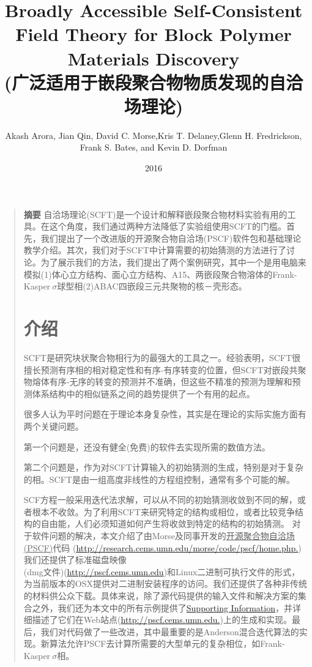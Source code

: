 \documentclass{article}
\begin{document}
\begin{CJK}{UTF8}{gkai}
 

\title{Broadly Accessible Self-Consistent Field Theory for Block Polymer Materials Discovery\\
(广泛适用于嵌段聚合物物质发现的自洽场理论)}
\author{Akash Arora, Jian Qin, David C. Morse,Kris T. Delaney,Glenn H. Fredrickson, Frank S. Bates, and Kevin D. Dorfman}
\date{2016}
\maketitle
\begin{quotation}
\textbf{摘要}
自洽场理论(SCFT)是一个设计和解释嵌段聚合物材料实验有用的工具。在这个角度，我们通过两种方法降低了实验组使用SCFT的门槛。首先，我们提出了一个改进版的开源聚合物自洽场(PSCF)软件包和基础理论教学介绍。其次，我们对于SCFT中计算需要的初始猜测的方法进行了讨论。为了展示我们的方法，我们提出了两个案例研究，其中一个是用电脑来模拟(1)体心立方结构、面心立方结构、A15、两嵌段聚合物溶体的Frank-Kasper$~\sigma$球型相(2)ABAC四嵌段三元共聚物的核－壳形态。

\section{介绍}
SCFT是研究块状聚合物相行为的最强大的工具之一。经验表明，SCFT很擅长预测有序相的相对稳定性和有序-有序转变的位置，但SCFT对嵌段共聚物熔体有序-无序的转变的预测并不准确，但这些不精准的预测为理解和预测体系结构中的相似链系之间的趋势提供了一个有用的起点。

很多人认为平时问题在于理论本身复杂性，其实是在理论的实际实施方面有两个关键问题。

第一个问题是，还没有健全(免费)的软件去实现所需的数值方法。

第二个问题是，作为对SCFT计算输入的初始猜测的生成，特别是对于复杂的相。SCFT是由一组高度非线性的方程组控制，通常有多个可能的解。

SCF方程一般采用迭代法求解，可以从不同的初始猜测收敛到不同的解，或者根本不收敛。为了利用SCFT来研究特定的结构或相位，或者比较竞争结构的自由能，人们必须知道如何产生将收敛到特定的结构的初始猜测。
对于软件问题的解决，本文介绍了由Morse及同事开发的\underline{开源聚合物自洽场(PSCF)}代码
(\url{http://research.cems.umn.edu/morse/code/pscf/home.php.})
我们还提供了标准磁盘映像\\
(dmg文件)(\url{http://pscf.cems.umn.edu})和Linux二进制可执行文件的形式，为当前版本的OSX提供对二进制安装程序的访问。我们还提供了各种非传统的材料供公众下载。具体来说，除了源代码提供的输入文件和解决方案的集合之外，我们还为本文中的所有示例提供了\href{http://pubs.acs.org/doi/suppl/10.1021/acs.macromol.6b00107/suppl_file/ma6b00107_si_001.pdf}{Supporting Information}，并详细描述了它们在Web站点(\url{http://pscf.cems.umn.edu.})上的生成和实现。最后，我们对代码做了一些改进，其中最重要的是Anderson混合迭代算法的实现。新算法允许PSCF去计算所需要的大型单元的复杂相位，如Frank-Kasper$~\sigma$相。


\end{quotation}
\end{CJK}
\end{document}
